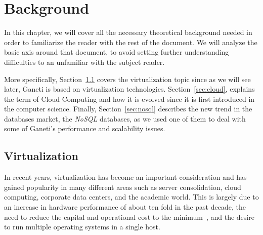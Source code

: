 \chapter{Background}\label{ch:background}

In this chapter, we will cover all the necessary theoretical background needed
in order to familiarize the reader with the rest of the document. We will
analyze the basic axis around that document, to avoid setting further
understanding difficulties to an unfamiliar with the subject reader.

More specifically, Section~\ref{sec:virt} covers the virtualization topic
since as we will see later, Ganeti is based on virtualization technologies.
Section~\ref{sec:cloud}, explains the term of Cloud Computing and how it is
evolved since it is first introduced in the computer science. Finally,
Section~\ref{sec:nosql} describes the new trend in the databases market,
the \emph{NoSQL} databases, as we used one of them to deal with some of Ganeti's
performance and scalability issues.

\section{Virtualization}\label{sec:virt}

In recent years, virtualization has become an important consideration and has
gained popularity in many different areas such as server consolidation, cloud
computing, corporate data centers, and the academic world. This is largely due
to an increase in hardware performance of about ten fold in the past decade, the
need to reduce the capital and operational cost to the minimum~\cite{Graziano},
and the desire to run multiple operating systems in a single host.

